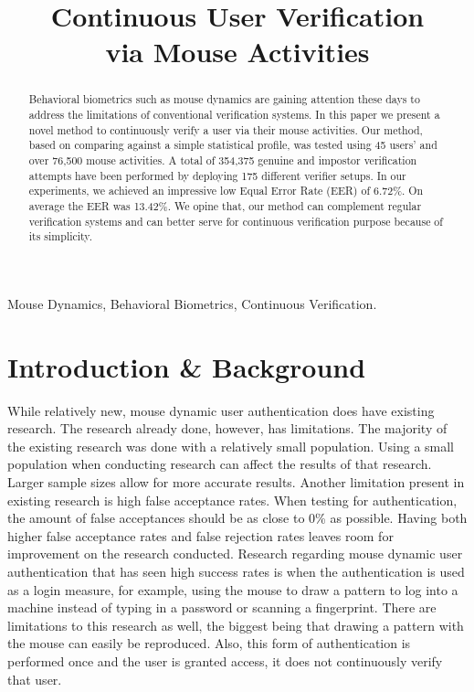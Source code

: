 \documentclass[conference]{IEEEtran}
\title{Continuous User Verification\\via Mouse Activities}
\begin{document}
\maketitle


\begin{abstract}
Behavioral biometrics such as mouse dynamics are gaining attention these days to address the limitations of
conventional verification systems. In this paper we present a novel method to continuously verify a user via
their mouse activities. Our method, based on comparing against a simple statistical profile, was tested using 45 users’ and over 76,500 mouse activities.
A total of 354,375 genuine and impostor verification attempts have been performed by deploying 175 different verifier
setups. In our experiments, we achieved an impressive low Equal Error Rate (EER) of 6.72\%. On average the EER
was 13.42\%. We opine that, our method can complement regular verification systems and can better serve for
continuous verification purpose because of its simplicity.
\end{abstract}
\begin{IEEEkeywords} 
Mouse Dynamics,
Behavioral Biometrics,
Continuous Verification.
 \end{IEEEkeywords}
\IEEEpeerreviewmaketitle

\section{Introduction \& Background}


While relatively new, mouse dynamic user authentication does have existing research. The research already done, however, has limitations. The majority of the existing research was done with a relatively small population. Using a small population when conducting research can affect the results of that research. Larger sample sizes allow for more accurate results. Another limitation present in existing research is high false acceptance rates. When testing for authentication, the amount of false acceptances should be as close to 0\% as possible. Having both higher false acceptance rates and false rejection rates leaves room for improvement on the research conducted. Research regarding mouse dynamic user authentication that has seen high success rates is when the authentication is used as a login measure, for example, using the mouse to draw a pattern to log into a machine instead of typing in a password or scanning a fingerprint. There are limitations to this research as well, the biggest being that drawing a pattern with the mouse can easily be reproduced. Also, this form of authentication is performed once and the user is granted access, it does not continuously verify that user.
\end{document}
